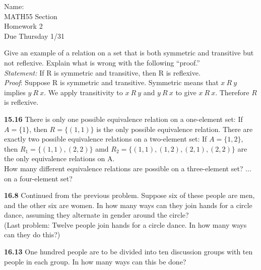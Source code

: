 \documentclass[10pt]{article}
\begin{document}

\begin{flushright}
	Name: \underline{\hspace{3cm}} \\
	MATH55 Section \underline{\hspace{0.5cm}} \\
	Homework 2 \\
	Due Thursday 1/31
\end{flushright}

\begin{framed}
	Give an example of a relation on a set that is both symmetric and transitive but not reflexive.
Explain what is wrong with the following “proof.”\\

\indent \textit{Statement:} If R is symmetric and transitive, then R is reflexive.\\
\indent \textit{Proof}: Suppose R is symmetric and transitive. 
Symmetric means that $x\:R\:y$ implies $y\:R\:x$. We apply transitivity to $x\:R\:y$ and $y\:R\:x$ to give $x\:R\:x$. Therefore $R$ is reflexive.
\end{framed}

\pagebreak

\begin{framed}
    \textbf{15.16} There is only one possible equivalence relation on a one-element set:
    If $A = \{1\}$, then $R = \{(1,1)\}$ is the only possible equivalence relation.
    There are exactly two possible equivalence relations on a two-element set:
    If $A=\{1, 2\}$, then $R_1 = \{(1,1),(2,2)\}$ amd $R_2 = \{(1,1),(1,2),(2,1),(2,2)\}$ are
    the only equivalence relations on A.\\

    \indent How many different equivalence relations are possible on a three-element set?
    ... on a four-element set?
\end{framed}

\pagebreak

\begin{framed}
	\textbf{16.8} Continued from the previous problem. Suppose six of these people are men, and the
    other six are women. In how many ways can they join hands for a circle dance, assuming
    they alternate in gender around the circle?\\

    (Last problem: Twelve people join hands for a circle dance. In how many ways can they do this?)
\end{framed}

\pagebreak

\begin{framed}
    \textbf{16.13} One hundred people are to be divided into ten discussion groups with ten people in each group.
    In how many ways can this be done?
\end{framed}
\end{document}
